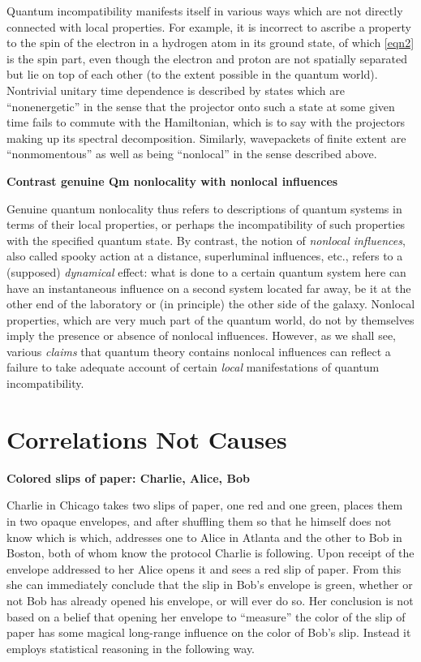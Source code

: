 \documentclass[12pt]{article} %
\def\outl#1{\par{\medskip\noindent\hspace*{.5cm}\bf
      \mathversion{bold}#1\mathversion{normal}\smallskip} }
\def\np{} \def\xa{} \def\xb{} \def\xn{} \def\xp{}
\def\outl#1{} \def\np{} \def\xa{} \def\xb{} \def\xn{} \def\xp{}
\def\outl#1{\par{\medskip\noindent\hspace*{.5cm}\bf
      \mathversion{bold}#1\mathversion{normal}\smallskip} }
\def\np{\newpage }\def\xn{\nopagebreak }\def\xp{\pagebreak }
\begin{document}
Quantum incompatibility manifests itself in various ways which are not directly
connected with local properties.  For example, it is incorrect to ascribe a
property to the spin of the electron in a hydrogen atom in its ground state,
of which \eqref{eqn2} is the spin part, even though the electron and proton
are not spatially separated but lie on top of each other (to the extent
possible in the quantum world).  Nontrivial unitary time dependence is
described by states which are ``nonenergetic'' in the sense that the projector
onto such a state at some given time fails to commute with the Hamiltonian,
which is to say with the projectors making up its spectral
decomposition. Similarly, wavepackets of finite extent are ``nonmomentous'' as
well as being ``nonlocal'' in the sense described above.

\xb
\outl{Contrast genuine Qm nonlocality with nonlocal influences}
\xa

Genuine quantum nonlocality thus refers to descriptions of quantum systems in
terms of their local properties, or perhaps the incompatibility of such
properties with the specified quantum state.  By contrast, the notion of
\emph{nonlocal influences}, also called spooky action at a distance,
superluminal influences, etc., refers to a (supposed) \emph{dynamical} effect:
what is done to a certain quantum system here can have an instantaneous
influence on a second system located far away, be it at the other end of the
laboratory or (in principle) the other side of the galaxy.  Nonlocal
properties, which are very much part of the quantum world, do not by
themselves imply the presence or absence of nonlocal influences.  However, as
we shall see, various \emph{claims} that quantum theory contains nonlocal
influences can reflect a failure to take adequate account of certain
\emph{local} manifestations of quantum incompatibility.

\xb
\section{Correlations Not Causes}
\label{sct3}
\xa

\xb
\outl{Colored slips of paper: Charlie, Alice, Bob}
\xa



Charlie in Chicago takes two slips of paper, one red and one green, places
them in two opaque envelopes, and after shuffling them so that he himself does
not know which is which, addresses one to Alice in Atlanta and the other to
Bob in Boston, both of whom know the protocol Charlie is following.  Upon
receipt of the envelope addressed to her Alice opens it and sees a red slip of
paper.  From this she can immediately conclude that the slip in Bob's envelope
is green, whether or not Bob has already opened his envelope, or will ever do
so. Her conclusion is not based on a belief that opening her envelope to
``measure'' the color of the slip of paper has some magical long-range
influence on the color of Bob's slip.  Instead it employs statistical
reasoning in the following way.
\end{document}
